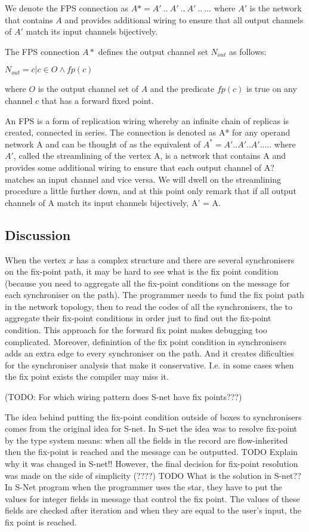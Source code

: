 We denote the FPS connection as $A* = A' \: .. \: A' \: .. \: A' \: .. \: \dots$ where $A'$ is the network that contains $A$ and provides additional wiring to ensure that all output channels of $A'$ match its input channels bijectively.

The FPS connection $A*$ defines the output channel set $N_{out}$ as follows:

$N_{out} = { c | c \in O \land fp(c) }$

where $O$ is the output channel set of $A$ and the predicate $fp(c)$ is true on any channel $c$ that has a forward fixed point.


An FPS is a form of replication wiring whereby an infinite chain of replicas is created, connected
in series. The connection is denoted as A* for any operand network A and can be thought of as the equivalent of
$A^* = A'..A'..A'.. \dots$
where $A'$, called the streamlining of the vertex A, is a network that contains A and provides some additional wiring to ensure that each output channel of A? matches an input channel and vice versa. We will dwell on the streamlining procedure a little further down, and at this point only remark that if all output channels of A match its input channels bijectively, A' = A.



    \subsection{Discussion\label{ffp_discussion}}
When the vertex $x$ has a complex structure and there are several synchronisers on the fix-point path, it may be hard to see what is the fix point condition (because you need to aggregate all the fix-point conditions on the message for each synchroniser on the path). The programmer needs to fund the fix point path in the network topology, then to read the codes of all the synchronisers, the to aggregate their fix-point conditions in order just to find out the fix-point condition. This approach for the forward fix point makes debugging too complicated. Moreover, definintion of the fix point condition in synchronisers adds an extra edge to every synchroniser on the path. And it creates dificulties for the synchroniser analysis that make it conservative. I.e. in some cases when the fix point exists the compiler may miss it.

(TODO: For which wiring pattern does S-net have fix points???)

The idea behind putting the fix-point condition outside of boxes to synchronisers comes from the original idea for S-net. In S-net the idea was to resolve fix-point by the type system means: when all the fields in the record are flow-inherited then the fix-point is reached and the message can be outputted. TODO Explain why it was changed in S-net!! However, the final decision for fix-point resolution was made on the side of simplicity (????) TODO What is the solution in S-net??
In S-Net program when the programmer uses the star, they have to put the values for integer fields in message that control the fix point. The values of these fields are checked after iteration and when they are equal to the user's input, the fix point is reached.

